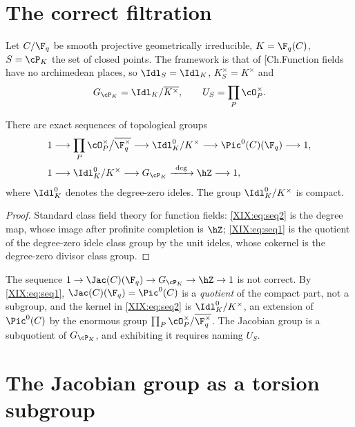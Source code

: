 \section{The correct filtration}

Let $C/\F_q$ be smooth projective geometrically irreducible, $K=\F_q(C)$, $S=\cP_K$ the set
of closed points. The framework is that of [Ch.Function fields have no archimedean places, so
$\Idl_S=\Idl_K$, $K^\times_S=K^\times$ and
\[
G_{\cP_K}=\Idl_K/\overline{K^\times},\qquad U_S=\prod_{P}\cO_P^\times .
\]

\begin{proposition}\label{XIX:prop:filtration}
There are exact sequences of topological groups
\begin{align}
1&\longrightarrow \prod_P\cO_P^\times\big/\overline{\F_q^\times}\longrightarrow \Idl^0_K/K^\times\longrightarrow\Pic^0(C)(\F_q)\longrightarrow1,\label{XIX:eq:seq1}\\
1&\longrightarrow \Idl^0_K/K^\times\longrightarrow G_{\cP_K}\xrightarrow{\ \deg\ }\hZ\longrightarrow1,\label{XIX:eq:seq2}
\end{align}
where $\Idl^0_K$ denotes the degree-zero ideles. The group $\Idl^0_K/K^\times$ is compact.
\end{proposition}

\begin{proof}
Standard class field theory for function fields: \eqref{XIX:eq:seq2} is the degree map, whose
image after profinite completion is $\hZ$; \eqref{XIX:eq:seq1} is the quotient of the degree-zero
idele class group by the unit ideles, whose cokernel is the degree-zero divisor class group.
\end{proof}

\begin{remark}\label{XIX:rem:proposedseq}
The sequence $1\to\Jac(C)(\F_q)\to G_{\cP_K}\to\hZ\to1$ is not correct. By
\eqref{XIX:eq:seq1}, $\Jac(C)(\F_q)=\Pic^0(C)$ is a \emph{quotient} of the compact part, not a
subgroup, and the kernel in \eqref{XIX:eq:seq2} is $\Idl^0_K/K^\times$, an extension of
$\Pic^0(C)$ by the enormous group $\prod_P\cO_P^\times/\overline{\F_q^\times}$. The Jacobian
group is a subquotient of $G_{\cP_K}$, and exhibiting it requires naming $U_S$.
\end{remark}

\section{The Jacobian group as a torsion subgroup}

